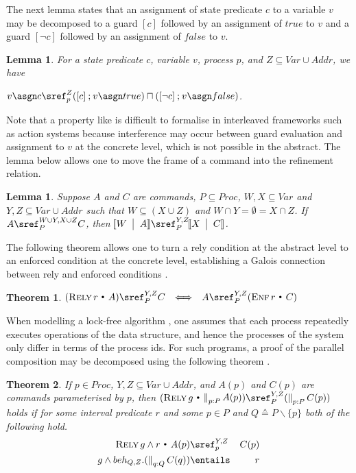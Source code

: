 \documentclass{article}
\makeatletter
\newcommand{\st}{~{\scriptscriptstyle ^\bullet}~}
\def \rely {\mathop{\textsc{Rely}}}
\def \enf {\mathop{\textsc{Enf}}}
\theoremstyle{plain}
\newcounter{thm}
\newtheorem{theorem}{Theorem}[section]
\newtheorem{lemma}[thm]{Lemma}
\theoremstyle{definition}
\def \llb {\llbracket}
\def \rrb {\rrbracket}
\newcommand{\Context}[2]
{\!\llb #1 
    \begin{array}[c]{@{~~}|@{~~}l@{}}
      #2
    \end{array}\rrb } \newcommand{\Var}[2]{\textsc{Var}~#1 \st #2}
\newcommand{\Rely}[2]
{\rely #1 \st
    \begin{array}[c]{@{}l@{}}
      #2
    \end{array}}
\newcommand{\Enf}[2]
{\enf #1 \st
    \begin{array}[c]{@{}l@{}}
      #2
    \end{array}}
\newcommand{\Par}{\textstyle\mathop{\|}}
\def\ch{\mathbin{;}}
\def \bs {\backslash}
\makeatother
\begin{document}
The next lemma states that an assignment of state predicate $c$ to a
variable $v$ may be decomposed to a guard $[c]$ followed by an
assignment of $true$ to $v$ and a guard $[\neg c]$ followed by an
assignment of $false$ to $v$.
\begin{lemma}
  \label{lem:bool-exp}
  For a state predicate $c$, variable $v$, process $p$, and
  $Z\subseteq Var\cup Addr$, we have

  $v \asgn c \sref_p^{Z}
  ([c] \ch v \asgn true) \sqcap ([\neg c] \ch v \asgn false)$.
\end{lemma}
Note that a property like  is difficult to
formalise in interleaved frameworks such as action systems
\cite{BvW99} because interference may occur between guard evaluation
and assignment to $v$ at the concrete level, which is not possible in
the abstract. The lemma below allows one to move the frame of a
command into the refinement relation.
\begin{lemma}
  \label{lem:add-context}
  Suppose $A$ and $C$ are commands, $P \subseteq Proc$, $W,X \subseteq
  Var$ and $Y,Z \subseteq Var \cup Addr$ such that $W \subseteq (X
  \cup Z)$ and $W \cap Y = \emptyset = X \cap Z$. If $A \sref^{W\cup
    Y, X \cup Z }_P C$, then $\Context{W}{A} \sref_P^{Y,Z}
  \Context{X}{C}$.
\end{lemma}

The following theorem allows one to turn a rely condition at the
abstract level to an enforced condition at the concrete level,
establishing a Galois connection between rely and enforced conditions
\cite{DDH12}.
\begin{theorem}
  \label{thm:rely-enf-gc}
  $(\Rely{r}{A}) \sref_P^{Y,Z} C\:\: \iff\:\: A \sref_P^{Y,Z} (\Enf{r}{C})$
\end{theorem}
When modelling a lock-free algorithm \cite{CGLM06,DSW11,VHHS06}, one
assumes that each process repeatedly executes operations of the data
structure, and hence the processes of the system only differ in terms
of the process ids. For such programs, a proof of the parallel
composition may be decomposed using the following theorem \cite{DD12}.
\begin{theorem}
  \label{thm:decompose}
  If $p \in Proc$, $Y,Z \subseteq Var \cup Addr$, and
  $A(p) $ and $C(p)$ are commands parameterised by $p$, then $
  (\Rely{g}{\Par_{p:P}A(p)}) \sref_P^{Y,Z} (\Par_{p:P}C(p))$ holds if
  for some interval predicate $r$ and some $p \in P$ and $Q \sdef P
  \bs \{p\}$ both of the following hold.
  \begin{eqnarray}
    \label{eq:17}
    \Rely{g \land r}{A(p)} & \sref_{p}^{Y,Z} &
    C(p)\\
    \label{eq:18}
    g \land beh_{Q,Z}.(\Par_{q:Q}C(q)) &  \entails &
    r
  \end{eqnarray}
\end{theorem}
\end{document}
